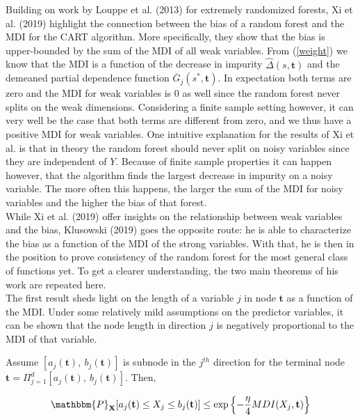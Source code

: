 Building on work by Louppe et al. (2013) for extremely randomized forests, Xi et al. (2019) highlight the connection between the bias of a random forest and the MDI for the CART algorithm. 
More specifically, they show that the bias is upper-bounded by the sum of the MDI of all weak variables. 
From (\ref{weight}) we know that the MDI is a function of the decrease in impurity $\hat{\Delta}(s, \mathbf{t})$ and the demeaned partial dependence function $\bar{G}_j(s^*, \mathbf{t})$.
In expectation both terms are zero and the MDI for weak variables is 0 as well since the random forest never splits on the weak dimensions. 
Considering a finite sample setting however, it can very well be the case that both terms are different from zero, and we thus have a positive MDI for weak variables.
One intuitive explanation for the results of Xi et al. is that in theory the random forest should never split on noisy variables since they are independent of $Y$. 
Because of finite sample properties it can happen however, that the algorithm finds the largest decrease in impurity on a noisy variable. 
The more often this happens, the larger the sum of the MDI for noisy variables and the higher the bias of that forest. \\
While Xi et al. (2019) offer insights on the relationship between weak variables and the bias, Klusowski (2019) goes the opposite route: he is able to characterize the bias as a function of the MDI of the strong variables. 
With that, he is then in the position to prove consistency of the random forest for the most general class of functions yet. To get a clearer understanding, the two main theorems of his work are repeated here. \\

The first result sheds light on the length of a variable $j$ in node $\mathbf{t}$ as a function of the MDI. 
Under some relatively mild assumptions on the predictor variables, it can be shown that the node length in direction $j$ is negatively proportional to the MDI of that variable.

\begin{theorem}
    Assume $[a_j(\mathbf{t}),\ b_j(\mathbf{t})]$ is subnode in the $j^{th}$ direction for the terminal node $\mathbf{t} = \Pi_{j=1}^d [a_j(\mathbf{t}),\ b_j(\mathbf{t})]$. Then,

    \begin{align}
        \mathbbm{P}_{\mathbf{X}} [a_j(\mathbf{t}) \leq X_j \leq b_j(\mathbf{t})] \leq \text{exp} \left\{- \frac{\eta}{4} MDI(X_j, \mathbf{t}) \right\} \label{theorem1}
    \end{align}
\end{theorem}

